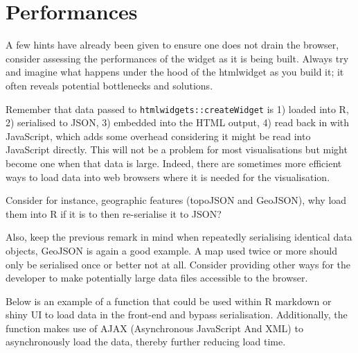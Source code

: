 \documentclass[
  10pt,
]{krantz}
\makeatletter
\newenvironment{Shaded}{\begin{snugshade}}{\end{snugshade}}
\newcommand{\CommentTok}[1]{\textcolor[rgb]{0.37,0.37,0.37}{\textit{#1}}}
\newcommand{\ControlFlowTok}[1]{\textcolor[rgb]{0.27,0.27,0.27}{\textbf{#1}}}
\newcommand{\KeywordTok}[1]{\textcolor[rgb]{0.27,0.27,0.27}{\textbf{#1}}}
\newcommand{\NormalTok}[1]{#1}
\newcommand{\OperatorTok}[1]{\textcolor[rgb]{0.43,0.43,0.43}{\textbf{#1}}}
\newcommand{\StringTok}[1]{\textcolor[rgb]{0.5,0.5,0.5}{#1}}
\newenvironment{kframe}{%
\medskip{}
\setlength{\fboxsep}{.8em}
 \def\at@end@of@kframe{}%
 \ifinner\ifhmode%
  \def\at@end@of@kframe{\end{minipage}}%
  \begin{minipage}{\columnwidth}%
 \fi\fi%
 \def\FrameCommand##1{\hskip\@totalleftmargin \hskip-\fboxsep
 \colorbox{shadecolor}{##1}\hskip-\fboxsep
     \hskip-\linewidth \hskip-\@totalleftmargin \hskip\columnwidth}%
 \MakeFramed {\advance\hsize-\width
   \@totalleftmargin\z@ \linewidth\hsize
   \@setminipage}}%
 {\par\unskip\endMakeFramed%
 \at@end@of@kframe}
\renewenvironment{Shaded}{\begin{kframe}}{\end{kframe}}
\makeatother
\begin{document}
\hypertarget{widgets-adv-performances}{%
\section{Performances}\label{widgets-adv-performances}}

A few hints have already been given to ensure one does not drain the browser, consider assessing the performances of the widget as it is being built. Always try and imagine what happens under the hood of the htmlwidget as you build it; it often reveals potential bottlenecks and solutions.

Remember that data passed to \texttt{htmlwidgets::createWidget} is 1) loaded into R, 2) serialised to JSON, 3) embedded into the HTML output, 4) read back in with JavaScript, which adds some overhead considering it might be read into JavaScript directly. This will not be a problem for most visualisations but might become one when that data is large. Indeed, there are sometimes more efficient ways to load data into web browsers where it is needed for the visualisation.

Consider for instance, geographic features (topoJSON and GeoJSON), why load them into R if it is to then re-serialise it to JSON?

Also, keep the previous remark in mind when repeatedly serialising identical data objects, GeoJSON is again a good example. A map used twice or more should only be serialised once or better not at all. Consider providing other ways for the developer to make potentially large data files accessible to the browser.

Below is an example of a function that could be used within R markdown or shiny UI to load data in the front-end and bypass serialisation. Additionally, the function makes use of AJAX (Asynchronous JavaScript And XML) to asynchronously load the data, thereby further reducing load time.

\begin{Shaded}
\end{Shaded}
\end{document}

